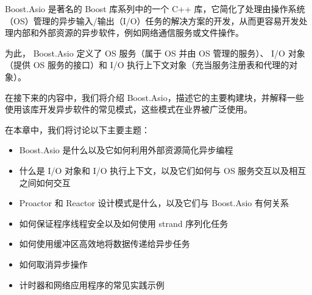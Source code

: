 Boost.Asio 是著名的 Boost 库系列中的一个 C++ 库，它简化了处理由操作系统（OS）管理的异步输入/输出（I/O）任务的解决方案的开发，从而更容易开发处理内部和外部资源的异步软件，例如网络通信服务或文件操作。

为此， Boost.Asio 定义了 OS 服务（属于 OS 并由 OS 管理的服务）、 I/O 对象（提供 OS 服务的接口）和 I/O 执行上下文对象（充当服务注册表和代理的对象）。

在接下来的内容中，我们将介绍 Boost.Asio，描述它的主要构建块，并解释一些使用该库开发异步软件的常见模式，这些模式在业界被广泛使用。

在本章中，我们将讨论以下主要主题：

\begin{itemize}
\item
Boost.Asio 是什么以及它如何利用外部资源简化异步编程

\item
什么是 I/O 对象和 I/O 执行上下文，以及它们如何与 OS 服务交互以及相互之间如何交互

\item
Proactor 和 Reactor 设计模式是什么，以及它们与 Boost.Asio 有何关系

\item
如何保证程序线程安全以及如何使用 strand 序列化任务

\item
如何使用缓冲区高效地将数据传递给异步任务

\item
如何取消异步操作

\item
计时器和网络应用程序的常见实践示例
\end{itemize}
